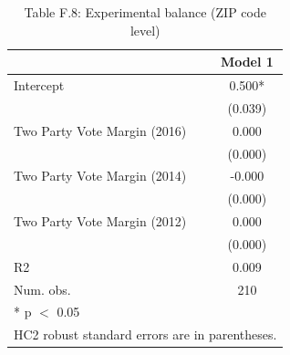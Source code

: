 \begin{table}
\centering
\caption{Table F.8: Experimental balance (ZIP code level)}
\centering
\begin{tabular}[t]{lc}
\toprule
  & Model 1\\
\midrule
Intercept & 0.500*\\
 & (0.039)\\
Two Party Vote Margin (2016) & 0.000\\
 & \vphantom{2} (0.000)\\
Two Party Vote Margin (2014) & -0.000\\
 & \vphantom{1} (0.000)\\
Two Party Vote Margin (2012) & 0.000\\
 & (0.000)\\
\midrule
R2 & 0.009\\
Num. obs. & 210\\
\bottomrule
\multicolumn{2}{l}{\rule{0pt}{1em}* p $<$ 0.05}\\
\multicolumn{2}{l}{\rule{0pt}{1em}HC2 robust standard errors are in parentheses.}\\
\end{tabular}
\end{table}
